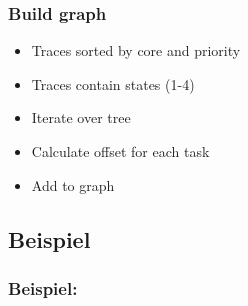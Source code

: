 \documentclass{beamer}
\begin{document}
\begin{frame}
	\frametitle{Build graph}
	\begin{block}{}
		\begin{itemize}
			\item Traces sorted by core and priority
			\item Traces contain states (1-4)
			\item Iterate over tree
			\item Calculate offset for each task
			\item Add to graph
		\end{itemize}
	\end{block}
\end{frame}




\begin{frame}
\section{Beispiel}
	\frametitle{Beispiel:}
\begin{block}{}
\end{block}
\end{frame}
\end{document}
